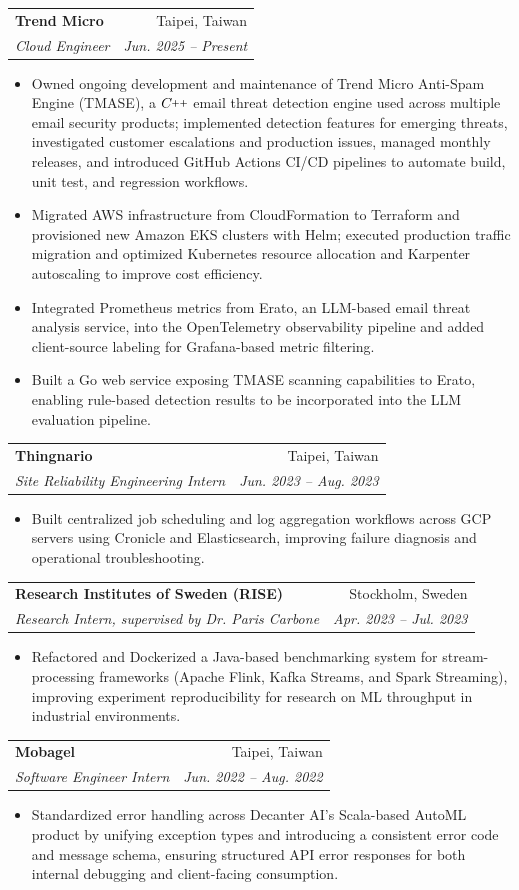 \documentclass[letterpaper,11pt]{article}
\makeatletter
\newcommand{\resumeItem}[1]{
  \item\small{#1}
}
\newcommand{\resumeSubheading}[4]{
  \vspace{-1pt}\item
    \begin{tabular*}{0.97\textwidth}[t]{l@{\extracolsep{\fill}}r}
      \textbf{#1} & #2 \\
      \textit{\small#3} & \textit{\small #4} \\
    \end{tabular*}\vspace{-5pt}
}
\newcommand{\resumeItemListStart}{\begin{itemize}}
\newcommand{\resumeItemListEnd}{\end{itemize}\vspace{-5pt}}
\newcommand{\CC}{C\nolinebreak\hspace{-.05em}\raisebox{.4ex}{\tiny\bf +}\nolinebreak\hspace{-.10em}\raisebox{.4ex}{\tiny\bf +}}
\def\CC{{C\nolinebreak[4]\hspace{-.05em}\raisebox{.4ex}{\tiny\bf ++}}}
\makeatother
\begin{document}
    \resumeSubheading
      {Trend Micro}{Taipei, Taiwan}
      {Cloud Engineer}{Jun. 2025 -- Present}
      \resumeItemListStart
        \resumeItem{}{Owned ongoing development and maintenance of Trend Micro %
        Anti-Spam Engine (TMASE), a $\CC$ email threat detection engine used %
        across multiple email security products; implemented detection features %
        for emerging threats, investigated customer escalations and production %
        issues, managed monthly releases, and introduced GitHub Actions CI/CD %
        pipelines to automate build, unit test, and regression workflows.}
        \resumeItem{}{Migrated AWS infrastructure from CloudFormation to %
        Terraform and provisioned new Amazon EKS clusters with Helm; executed %
        production traffic migration and optimized Kubernetes resource %
        allocation and Karpenter autoscaling to improve cost efficiency.}
        \resumeItem{}{Integrated Prometheus metrics from Erato, an LLM-based %
        email threat analysis service, into the OpenTelemetry observability %
        pipeline and added client-source labeling for Grafana-based metric %
        filtering.}
        \resumeItem{}{Built a Go web service exposing TMASE scanning %
        capabilities to Erato, enabling rule-based detection results to be %
        incorporated into the LLM evaluation pipeline.}
      \resumeItemListEnd

    \resumeSubheading
      {Thingnario}{Taipei, Taiwan}
      {Site Reliability Engineering Intern}{Jun. 2023 -- Aug. 2023}
      \resumeItemListStart
        \resumeItem{}{Built centralized job scheduling and log aggregation %
        workflows across GCP servers using Cronicle and Elasticsearch, %
        improving failure diagnosis and operational troubleshooting.}
      \resumeItemListEnd

    \resumeSubheading
      {Research Institutes of Sweden (RISE)}{Stockholm, Sweden}
      {Research Intern, supervised by Dr. Paris Carbone}{Apr. 2023 -- Jul. 2023}
      \resumeItemListStart
        \resumeItem{}{Refactored and Dockerized a Java-based benchmarking %
        system for stream-processing frameworks (Apache Flink, Kafka Streams, %
        and Spark Streaming), improving experiment reproducibility for research %
        on ML throughput in industrial environments.}
      \resumeItemListEnd

    \resumeSubheading
      {Mobagel}{Taipei, Taiwan}
      {Software Engineer Intern}{Jun. 2022 -- Aug. 2022}
      \resumeItemListStart
        \resumeItem{}{Standardized error handling across Decanter AI's %
        Scala-based AutoML product by unifying exception types and introducing %
        a consistent error code and message schema, ensuring structured API %
        error responses for both internal debugging and client-facing %
        consumption.}
      \resumeItemListEnd
\end{document}
